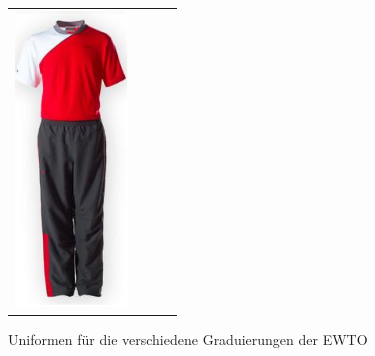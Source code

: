 \documentclass[a4paper,12pt]{scrartcl}
\begin{document}
\begin{figure}[htbp]
\begin{tabular}{cccc}
			\includegraphics[width=3cm]{image/uniformen/meister}
	\end{tabular}
	\caption{Uniformen f\"ur die verschiedene Graduierungen der EWTO}
\end{figure}



\end{document}
